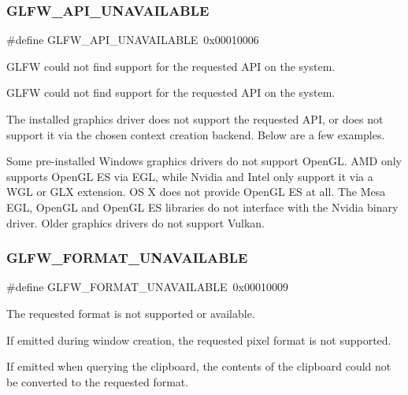 \subsubsection{\texorpdfstring{G\+L\+F\+W\+\_\+\+A\+P\+I\+\_\+\+U\+N\+A\+V\+A\+I\+L\+A\+B\+LE}{GLFW\_API\_UNAVAILABLE}}
{\footnotesize\ttfamily \#define G\+L\+F\+W\+\_\+\+A\+P\+I\+\_\+\+U\+N\+A\+V\+A\+I\+L\+A\+B\+LE~0x00010006}



G\+L\+FW could not find support for the requested A\+PI on the system. 

G\+L\+FW could not find support for the requested A\+PI on the system.

The installed graphics driver does not support the requested A\+PI, or does not support it via the chosen context creation backend. Below are a few examples.

\begin{DoxyParagraph}{}
Some pre-\/installed Windows graphics drivers do not support Open\+GL. A\+MD only supports Open\+GL ES via E\+GL, while Nvidia and Intel only support it via a W\+GL or G\+LX extension. OS X does not provide Open\+GL ES at all. The Mesa E\+GL, Open\+GL and Open\+GL ES libraries do not interface with the Nvidia binary driver. Older graphics drivers do not support Vulkan. 
\end{DoxyParagraph}
\mbox{\label{group__errors_ga196e125ef261d94184e2b55c05762f14}} 
\subsubsection{\texorpdfstring{G\+L\+F\+W\+\_\+\+F\+O\+R\+M\+A\+T\+\_\+\+U\+N\+A\+V\+A\+I\+L\+A\+B\+LE}{GLFW\_FORMAT\_UNAVAILABLE}}
{\footnotesize\ttfamily \#define G\+L\+F\+W\+\_\+\+F\+O\+R\+M\+A\+T\+\_\+\+U\+N\+A\+V\+A\+I\+L\+A\+B\+LE~0x00010009}



The requested format is not supported or available. 

If emitted during window creation, the requested pixel format is not supported.

If emitted when querying the clipboard, the contents of the clipboard could not be converted to the requested format.

